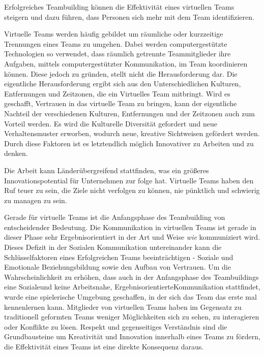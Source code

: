 \documentclass[a4paper,11pt]{article}%
\renewcommand{\\}{\vspace*{0.5\baselineskip} \newline}
\begin{document}
Erfolgreiches Teambuilding können die Effektivität eines virtuellen Teams steigern und dazu führen, dass Personen sich mehr mit dem Team identifizieren. \citep{kaiser2000student}

Virtuelle Teams werden häufig gebildet um räumliche oder kurzzeitige Trennungen eines Teams zu umgehen. Dabei werden computergestützte Technologien so verwendet, dass räumlich getrennte Teammitglieder ihre Aufgaben, mittels computergestützter Kommunikation, im Team koordinieren können. \citep[p. 117-119]{peters2007identifying} \citep[p. 1-2]{cascio2003leadership}
Diese jedoch zu gründen, stellt nicht die Herausforderung dar. Die eigentliche Herausforderung ergibt sich aus den Unterschiedlichen Kulturen, Entfernungen und Zeitzonen, die ein Virtuelles Team mitbringt. Wird es geschafft, Vertrauen in das virtuelle Team zu bringen, kann der eigentliche Nachteil der verschiedenen Kulturen, Entfernungen und der Zeitzonen auch zum Vorteil werden. Es wird die Kulturelle Diversität gefordert und neue Verhaltensmuster erworben, wodurch neue, kreative Sichtweisen gefördert werden. Durch diese Faktoren ist es letztendlich möglich Innovativer zu Arbeiten und zu denken. \citep{dyer1995team} \citep[p.405-416]{milliken1996searching}

Die Arbeit kann Länderübergreifend stattfinden, was ein größeres Innovationspotential für Unternehmen zur folge hat.	
Virtuelle Teams haben den Ruf teuer zu sein, die Ziele nicht verfolgen zu können, nie pünktlich und schwierig zu managen zu sein. \citep[p.243-244]{gassmann2003trends}

Gerade für virtuelle Teams ist die Anfangsphase des Teambuilding von entscheidender Bedeutung. 
Die Kommunikation in virtuellen Teams ist gerade in dieser Phase sehr Ergebnisorientiert in der Art und Weise \textit{wie} kommuniziert wird. Dieses Defizit in der Sozialen Kommunikation untereinander kann die Schlüsselfaktoren eines Erfolgreichen Teams beeinträchtigen - Soziale und Emotionale Beziehungsbildung sowie den Aufbau von Vertrauen. \citep[p.378]{ren2007applying} \\
Um die Wahrscheinlichkeit zu erhöhen, dass auch in der Anfangsphase des Teambuildings eine \glqq Soziale\grqq und keine \glqq Arbeitsnahe, Ergebnisorientierte\grqq Kommunikation stattfindet, wurde eine spielerische Umgebung geschaffen, in der sich das Team das erste mal kennenlernen kann. 
Mitglieder von virtuellen Teams haben im Gegensatz zu traditionell geformten Teams weniger Möglichkeiten sich zu sehen, zu interagieren oder Konflikte zu lösen. 
Respekt und gegenseitiges Verständnis sind die Grundbausteine um Kreativität und Innovation innerhalb eines Teams zu fördern, die Effektivität eines Teams ist eine direkte Konsequenz daraus.
\end{document}
